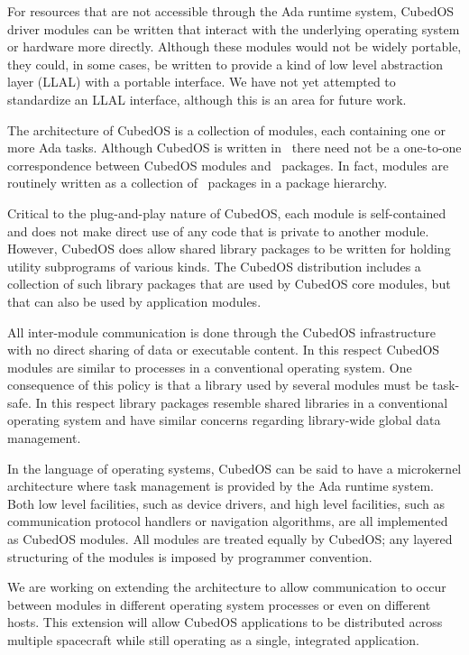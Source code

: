 For resources that are not accessible through the Ada runtime system, CubedOS driver modules can
be written that interact with the underlying operating system or hardware more directly.
Although these modules would not be widely portable, they could, in some cases, be written to
provide a kind of low level abstraction layer (LLAL) with a portable interface. We have not yet
attempted to standardize an LLAL interface, although this is an area for future work.

The architecture of CubedOS is a collection of modules, each containing one or more Ada tasks.
Although CubedOS is written in \SPARK\ there need not be a one-to-one correspondence between
CubedOS modules and \SPARK\ packages. In fact, modules are routinely written as a collection of
\SPARK\ packages in a package hierarchy. 

Critical to the plug-and-play nature of CubedOS, each module is self-contained and does not make
direct use of any code that is private to another module. However, CubedOS does allow shared
library packages to be written for holding utility subprograms of various kinds. The CubedOS
distribution includes a collection of such library packages that are used by CubedOS core
modules, but that can also be used by application modules. 

All inter-module communication is done through the CubedOS infrastructure with no direct sharing
of data or executable content. In this respect CubedOS modules are similar to processes in a
conventional operating system. One consequence of this policy is that a library used by several
modules must be task-safe. In this respect library packages resemble shared libraries in a
conventional operating system and have similar concerns regarding library-wide global data
management.

In the language of operating systems, CubedOS can be said to have a microkernel architecture
where task management is provided by the Ada runtime system. Both low level facilities, such as
device drivers, and high level facilities, such as communication protocol handlers or navigation
algorithms, are all implemented as CubedOS modules. All modules are treated equally by CubedOS;
any layered structuring of the modules is imposed by programmer convention.

We are working on extending the architecture to allow communication to occur between modules in
different operating system processes or even on different hosts. This extension will allow
CubedOS applications to be distributed across multiple spacecraft while still operating as a
single, integrated application. 

